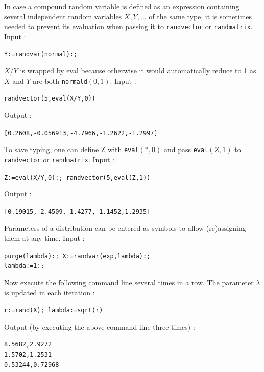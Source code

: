 In case a compound random variable is defined as an expression containing several independent random variables $X,Y,\dots$ of the same type, it is sometimes needed to prevent its evaluation when passing it to {\tt randvector} or {\tt randmatrix}. Input :
\begin{center}
  \tt Y:=randvar(normal):;
\end{center}
$X/Y$ is wrapped by eval because otherwise it would automatically reduce to 1 as $X$ and $Y$ are both {\tt normald}$(0,1)$. Input :
\begin{center}
  \tt randvector(5,eval(X/Y,0))
\end{center}
Output :
\begin{center}
  \tt [0.2608,-0.056913,-4.7966,-1.2622,-1.2997]
\end{center}
To save typing, one can define Z with {\tt eval}$(\ast,0)$ and pass {\tt eval}$(Z,1)$ to {\tt randvector} or {\tt randmatrix}. Input :
\begin{center}
  \tt Z:=eval(X/Y,0):; randvector(5,eval(Z,1))
\end{center}
Output :
\begin{center}
  \tt [0.19015,-2.4509,-1.4277,-1.1452,1.2935]
\end{center}
Parameters of a distribution can be entered as symbols to allow (re)assigning them at any time. Input :
\begin{center}
  \tt purge(lambda):; X:=randvar(exp,lambda):;\\lambda:=1:;
\end{center}
Now execute the following command line several times in a row. The parameter $\lambda$ is updated in each iteration :
\begin{center}
  \tt r:=rand(X); lambda:=sqrt(r)
\end{center}
Output (by executing the above command line three times) :
\begin{center}
  \tt 8.5682,2.9272\\1.5702,1.2531\\0.53244,0.72968
\end{center}
